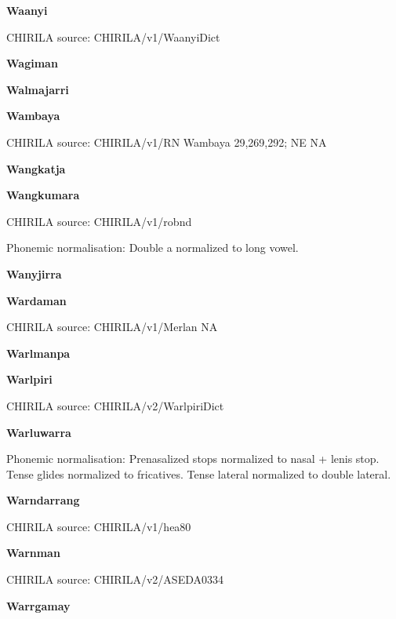 
\textbf{Waanyi}

CHIRILA source: CHIRILA/v1/WaanyiDict


\newpage


\textbf{Wagiman}


\textbf{Walmajarri}


\textbf{Wambaya}

CHIRILA source: CHIRILA/v1/RN Wambaya 29,269,292; NE NA

\textbf{Wangkatja}


\textbf{Wangkumara}

CHIRILA source: CHIRILA/v1/robnd


Phonemic normalisation: Double a normalized to long vowel.

\textbf{Wanyjirra}


\textbf{Wardaman}

CHIRILA source: CHIRILA/v1/Merlan NA

\textbf{Warlmanpa}


\textbf{Warlpiri}

CHIRILA source: CHIRILA/v2/WarlpiriDict


\textbf{Warluwarra}


Phonemic normalisation: Prenasalized stops normalized to nasal + lenis
stop. Tense glides normalized to fricatives. Tense lateral normalized to
double lateral.

\textbf{Warndarrang}

CHIRILA source: CHIRILA/v1/hea80


\textbf{Warnman}

CHIRILA source: CHIRILA/v2/ASEDA0334


\textbf{Warrgamay}

